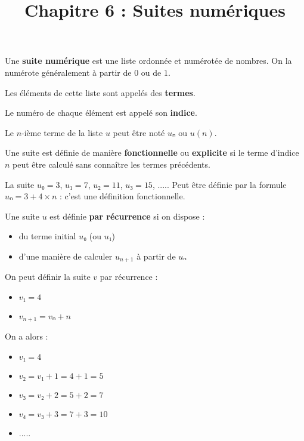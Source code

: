 \documentclass[
	classe=$1^{ere}STI2D$
]{coursclass}
\title{Chapitre 6 : Suites numériques}
\author{}
\date{}
\begin{document}
\maketitle

\begin{definition}
	Une \textbf{suite numérique} est une liste ordonnée et numérotée de nombres. On la numérote généralement à partir de $0$ ou de $1$.

	Les éléments de cette liste sont appelés des \textbf{termes}.

	Le numéro de chaque élément est appelé son \textbf{indice}.
\end{definition}

\begin{remarque}
	Le $n$-ième terme de la liste $u$ peut être noté $uₙ$ ou $u(n)$.
\end{remarque}

\begin{definition}
	Une suite est définie de manière \textbf{fonctionnelle} ou \textbf{explicite} si le terme d'indice $n$ peut être calculé sans connaître les termes précédents.
\end{definition}

\begin{exemple}
	La suite $u₀ = 3$, $u₁ = 7$, $u₂ = 11$, $u₃ = 15$, ..... Peut être définie par la formule $uₙ = 3 + 4 × n$ : c'est une définition fonctionnelle.
\end{exemple}

\begin{definition}
	Une suite $u$ est définie \textbf{par récurrence} si on dispose :
	\begin{itemize}
		\item du terme initial $u₀$ (ou $u₁$)
		\item d'une manière de calculer $u_{n+1}$ à partir de $uₙ$
	\end{itemize}
\end{definition}

\begin{exemple}
	On peut définir la suite $v$ par récurrence :
	\begin{itemize}
		\item $v₁ = 4$
		\item $v_{n+1} = vₙ + n$
	\end{itemize}
	On a alors :
	\begin{itemize}
		\item $v₁ = 4$
		\item $v₂ = v₁ + 1 = 4 + 1 = 5$
		\item $v₃ = v₂ + 2 = 5 + 2 = 7$
		\item $v₄ = v₃ + 3 = 7 + 3 = 10$
		\item .....
	\end{itemize}
\end{exemple}
\end{document}
